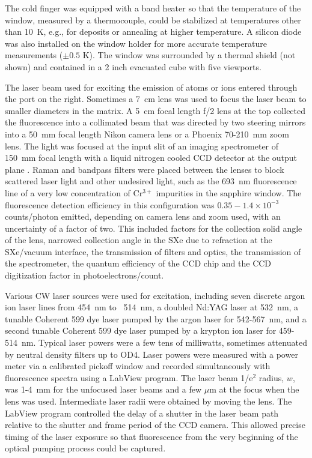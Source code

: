 \documentclass[aps,pra,reprint,superscriptaddress]{revtex4-1}
\begin{document}
The cold finger was equipped with a band heater so that the temperature of the window, measured by a thermocouple, could be stabilized at temperatures other than 10~K, e.g., for deposits or annealing at higher temperature. 
A silicon diode was also installed on the window holder for more accurate temperature measurements ($\pm 0.5$ K).
The window was surrounded by a thermal shield (not shown) and contained in a 2 inch evacuated cube with five viewports.

The laser beam used for exciting the emission of atoms or ions entered through the port on the right.
Sometimes a 7~cm lens was used to focus the laser beam to smaller diameters in the matrix.
A 5~cm focal length f/2 lens at the top collected the fluorescence into a collimated beam that was directed by two steering mirrors into a 50~mm focal length Nikon camera lens or a Phoenix 70-210~mm zoom lens.
The light was focused at the input slit of an imaging spectrometer of 150~mm focal length with a liquid nitrogen cooled CCD detector at the output plane \cite{Acton}. 
Raman and bandpass filters were placed between the lenses to block scattered laser light and other undesired light, such as the 693~nm fluorescence line of a very low concentration of Cr$^{3+} $ impurities in the sapphire window.
The fluorescence detection efficiency in this configuration was $0.35-1.4\times10^{-3}$ counts/photon emitted, depending on camera lens and zoom used, with an uncertainty of a factor of two.
This included factors for the collection solid angle of the lens, narrowed collection angle in the SXe due to refraction at the SXe/vacuum interface, the transmission of filters and optics, the transmission of the spectrometer, the quantum efficiency of the CCD chip and the CCD digitization factor in photoelectrons/count. 

Various CW laser sources were used for excitation, including seven discrete argon ion laser lines from 454~nm to ~514~nm, a doubled Nd:YAG laser at 532~nm, a tunable Coherent 599 dye laser pumped by the argon laser for 542-567~nm, and a second tunable Coherent 599 dye laser pumped by a krypton ion laser for 459-514~nm.
Typical laser powers were a few tens of milliwatts, sometimes attenuated by neutral density filters up to OD4.  
Laser powers were measured with a power meter via a calibrated pickoff window and recorded simultaneously with fluorescence spectra using a LabView program.
The laser beam 1/e$^2$ radius, $w$, was 1-4~mm for the unfocused laser beams and a few $\mu$m at the focus when the lens was used.
Intermediate laser radii were obtained by moving the lens.
The LabView program controlled the delay of a shutter in the laser beam path relative to the shutter and frame period of the CCD camera.
This allowed precise timing of the laser exposure so that fluorescence from the very beginning of the optical pumping process could be captured.
\end{document}
